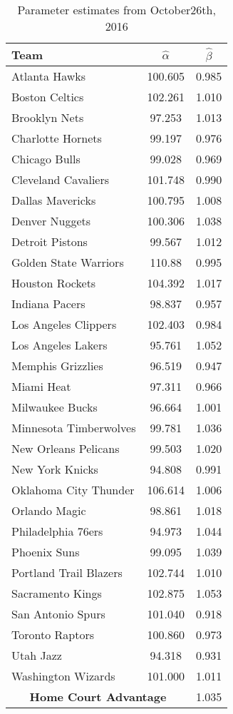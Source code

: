 \begin{table}[t]
	\centering
	\caption{Parameter estimates from October26th, 2016}
	\begin{tabular}{|l|c|c|}
		\hline
		\textbf{Team}  & \textbf{$\hat{\alpha}$} & \textbf{$\hat{\beta}$} \\ \hline
		Atlanta Hawks  & 100.605 & 0.985\\ \hline
		Boston Celtics & 102.261 & 1.010\\ \hline
		Brooklyn Nets  & 97.253 & 1.013\\ \hline
		Charlotte Hornets & 99.197 & 0.976\\ \hline
		Chicago Bulls & 99.028 & 0.969\\ \hline
		Cleveland Cavaliers & 101.748 & 0.990\\ \hline
		Dallas Mavericks & 100.795 & 1.008 \\ \hline
		Denver Nuggets & 100.306 & 1.038\\ \hline
		Detroit Pistons & 99.567 & 1.012\\ \hline
		Golden State Warriors & 110.88 & 0.995\\ \hline
		Houston Rockets & 104.392 & 1.017 \\ \hline
		Indiana Pacers & 98.837 & 0.957 \\ \hline
		Los Angeles Clippers & 102.403 & 0.984\\ \hline
		Los Angeles Lakers & 95.761 & 1.052 \\ \hline
		Memphis Grizzlies & 96.519 & 0.947\\ \hline
		Miami Heat & 97.311 & 0.966\\ \hline
		Milwaukee Bucks &96.664 & 1.001\\ \hline
		Minnesota Timberwolves & 99.781 & 1.036\\ \hline
		New Orleans Pelicans & 99.503 & 1.020\\ \hline
		New York Knicks & 94.808 & 0.991\\ \hline
		Oklahoma City Thunder & 106.614 & 1.006\\ \hline
		Orlando Magic & 98.861 & 1.018\\ \hline
		Philadelphia 76ers & 94.973 & 1.044\\ \hline
		Phoenix Suns & 99.095 & 1.039\\ \hline
		Portland Trail Blazers & 102.744 & 1.010\\ \hline
		Sacramento Kings & 102.875 & 1.053\\ \hline
		San Antonio Spurs & 101.040 & 0.918\\ \hline
		Toronto Raptors & 100.860 & 0.973 \\ \hline
		Utah Jazz & 94.318 & 0.931\\ \hline
		Washington Wizards & 101.000 & 1.011\\ \hline
		\multicolumn{2}{|c|}{\textbf{Home Court Advantage}} & 1.035\\ \hline
	\end{tabular}
	\label{table:dc_oct2016}
\end{table}


